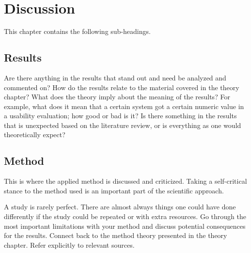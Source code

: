 
\chapter{Discussion}
\label{cha:discussion}

This chapter contains the following sub-headings.

\section{Results}
\label{sec:discussion-results}

Are there anything in the results that stand out and need be
analyzed and commented on? How do the results relate to the
material covered in the theory chapter? What does the theory
imply about the meaning of the results? For example, what
does it mean that a certain system got a certain numeric value
in a usability evaluation; how good or bad is it? Is there
something in the results that is unexpected based on the
literature review, or is everything as one would theoretically
expect?

\section{Method}
\label{sec:discussion-method}

This is where the applied method is discussed and criticized.
Taking a self-critical stance to the method used is an
important part of the scientific approach.

A study is rarely perfect. There are almost always things one
could have done differently if the study could be repeated or
with extra resources. Go through the most important
limitations with your method and discuss potential
consequences for the results. Connect back to the method
theory presented in the theory chapter. Refer explicitly to
relevant sources.

